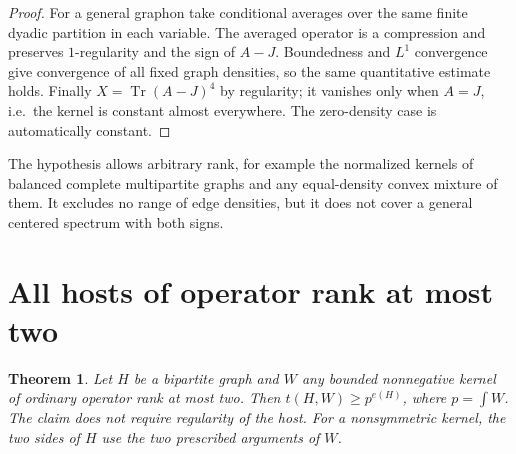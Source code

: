 \documentclass[11pt]{article}
\newtheorem{theorem}{Theorem}
\newcommand{\Tr}{\operatorname{Tr}}
\begin{document}
\begin{proof}
For a general graphon take conditional averages over the same finite dyadic partition in each variable. The averaged operator is a compression and preserves $1$-regularity and the sign of $A-J$. Boundedness and $L^1$ convergence give convergence of all fixed graph densities, so the same quantitative estimate holds. Finally $X=\Tr(A-J)^4$ by regularity; it vanishes only when $A=J$, i.e.\ the kernel is constant almost everywhere. The zero-density case is automatically constant.
\end{proof}
The hypothesis allows arbitrary rank, for example the normalized kernels of balanced complete multipartite graphs and any equal-density convex mixture of them. It excludes no range of edge densities, but it does not cover a general centered spectrum with both signs.

\section{All hosts of operator rank at most two}
\begin{theorem}\label{rank}
Let $H$ be a bipartite graph and $W$ any bounded nonnegative kernel of ordinary operator rank at most two. Then $t(H,W)\ge p^{e(H)}$, where $p=\int W$. The claim does not require regularity of the host. For a nonsymmetric kernel, the two sides of $H$ use the two prescribed arguments of $W$.
\end{theorem}
\end{document}
